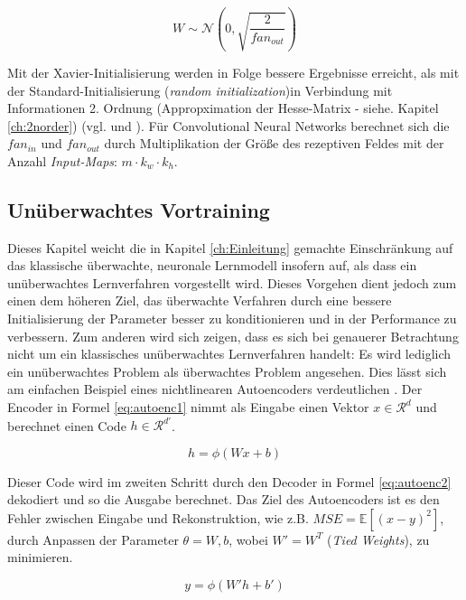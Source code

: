 \begin{equation}
\label{eq:xavier2} 
W \sim \mathcal{N} (0,\sqrt{\frac{2}{fan_{out}}})
\end{equation}

Mit der Xavier-Initialisierung werden in Folge bessere Ergebnisse erreicht, als mit der Standard-Initialisierung (\textit{random initialization})in Verbindung mit Informationen 2. Ordnung (Appropximation der Hesse-Matrix - siehe. Kapitel \ref{ch:2norder}) (vgl. \cite{Chapelle11} und \cite{Glorot2010}).
Für Convolutional Neural Networks berechnet sich die \textit{$fan_{in}$} und \textit{$fan_{out}$} durch Multiplikation der Größe des rezeptiven Feldes mit der Anzahl \textit{Input-Maps}: $m \cdot k_w \cdot k_h$.


\subsection{Unüberwachtes Vortraining}
Dieses Kapitel weicht die in Kapitel \ref{ch:Einleitung} gemachte Einschränkung auf das klassische überwachte, neuronale Lernmodell insofern auf, als dass ein unüberwachtes Lernverfahren vorgestellt wird. Dieses Vorgehen dient jedoch zum einen dem höheren Ziel, das überwachte Verfahren durch eine bessere Initialisierung der Parameter besser zu konditionieren und in der Performance zu verbessern. Zum anderen wird sich zeigen, dass es sich bei genauerer Betrachtung nicht um ein klassisches unüberwachtes Lernverfahren handelt: Es wird lediglich ein unüberwachtes Problem als überwachtes Problem angesehen. 
Dies lässt sich am einfachen Beispiel eines nichtlinearen Autoencoders verdeutlichen \cite[vgl. im Folgenden][]{Masci2011}. Der Encoder in Formel \ref{eq:autoenc1} nimmt als Eingabe einen Vektor $x \in \mathcal{R}^d$ und berechnet einen Code $h \in \mathcal{R}^{d'}$.
  
\begin{equation}
\label{eq:autoenc1} 
h = \phi(Wx + b)
\end{equation}

Dieser Code wird im zweiten Schritt durch den Decoder in Formel \ref{eq:autoenc2} dekodiert und so die Ausgabe berechnet. Das Ziel des Autoencoders ist es den Fehler zwischen Eingabe und Rekonstruktion, wie z.B. $MSE = \mathbb{E} [ (x - y)^2 ]$, durch Anpassen der Parameter $ \theta={W,b} $, wobei $W' = W^T$ (\textit{Tied Weights}), zu minimieren.
 
\begin{equation}
\label{eq:autoenc2} 
y = \phi(W'h + b')
\end{equation}

